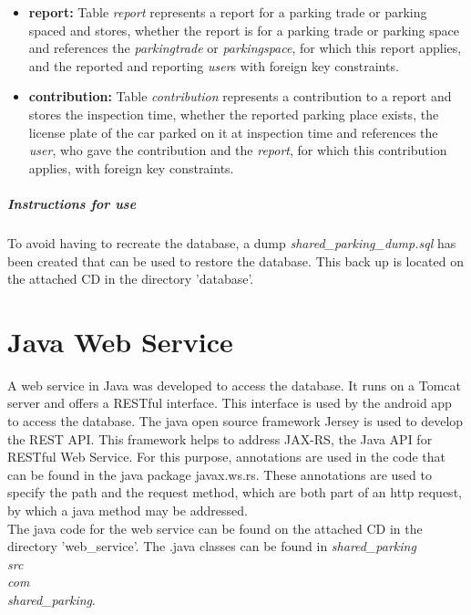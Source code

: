\begin{itemize}
\item \textbf{report:} Table \textit{report} represents a report for a parking trade or parking spaced and stores, whether the report is for a parking trade or parking space and references the \textit{parkingtrade} or \textit{parkingspace}, for which this report applies, and the reported and reporting \textit{user}s with foreign key constraints.
\item \textbf{contribution:} Table \textit{contribution} represents a contribution to a report and stores the inspection time, whether the reported parking place exists, the license plate of the car parked on it at inspection time and references the \textit{user}, who gave the contribution and the \textit{report}, for which this contribution applies, with foreign key constraints.
\end{itemize}

\subparagraph{Instructions for use}
To avoid having to recreate the database, a dump \textit{shared\_parking\_dump.sql} has been created that can be used to restore the database. This back up is located on the attached CD in the directory 'database'.

\section{Java Web Service}
A web service in Java was developed to access the database. It runs on a Tomcat server and offers a RESTful interface. This interface is used by the android app to access the database. The java open source framework Jersey is used to develop the REST API. This framework helps to address JAX-RS, the Java API for RESTful Web Service. For this purpose, annotations are used in the code that can be found in the java package javax.ws.rs. These annotations are used to specify the path and the request method, which are both part of an http request, by which a java method may be addressed.\\

The java code for the web service can be found on the attached CD in the directory 'web\_service'. The .java classes can be found in \textit{shared\_parking\\src\\com\\shared\_parking}.

